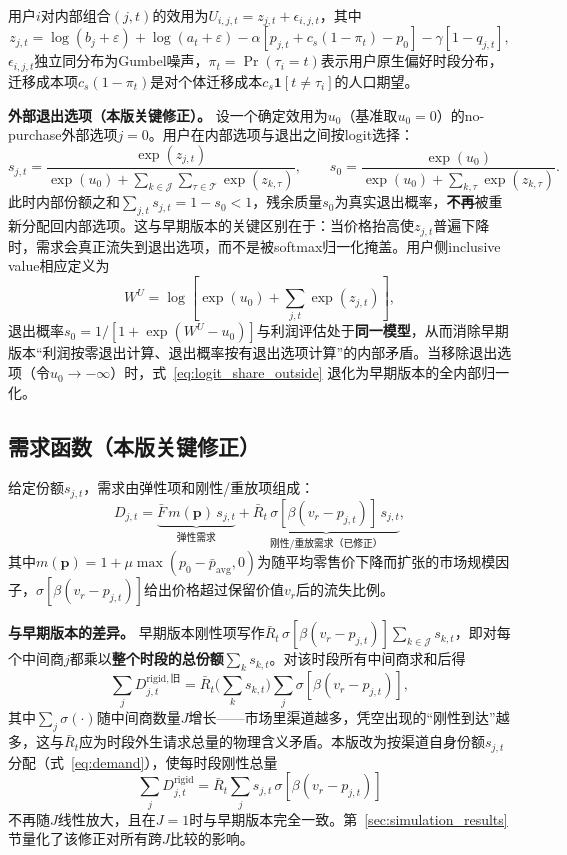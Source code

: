 \documentclass[UTF8,11pt]{ctexart}
\newcommand{\T}{\mathcal{T}}
\newcommand{\J}{\mathcal{J}}
\newcommand{\D}{D}
\newcommand{\p}{\boldsymbol{p}}
\begin{document}
用户$i$对内部组合$(j,t)$的效用为$U_{i,j,t}=z_{j,t}+\epsilon_{i,j,t}$，其中
\begin{equation}
  z_{j,t}=\log(b_j+\varepsilon)+\log(a_t+\varepsilon)
  -\alpha\left[p_{j,t}+c_s(1-\pi_t)-p_0\right]
  -\gamma[1-q_{j,t}],
  \label{eq:random_utility}
\end{equation}
$\epsilon_{i,j,t}$独立同分布为Gumbel噪声，$\pi_t=\Pr(\tau_i=t)$表示用户原生偏好时段分布，迁移成本项$c_s(1-\pi_t)$是对个体迁移成本$c_s\mathbf{1}[t\ne\tau_i]$的人口期望。

\textbf{外部退出选项（本版关键修正）。} 设一个确定效用为$u_0$（基准取$u_0=0$）的no-purchase外部选项$j=0$。用户在内部选项与退出之间按logit选择：
\begin{equation}
  s_{j,t}=\frac{\exp(z_{j,t})}
  {\exp(u_0)+\sum_{k\in\J}\sum_{\tau\in\T}\exp(z_{k,\tau})},
  \qquad
  s_0=\frac{\exp(u_0)}
  {\exp(u_0)+\sum_{k,\tau}\exp(z_{k,\tau})}.
  \label{eq:logit_share_outside}
\end{equation}
此时内部份额之和$\sum_{j,t}s_{j,t}=1-s_0<1$，残余质量$s_0$为真实退出概率，\textbf{不再}被重新分配回内部选项。这与早期版本的关键区别在于：当价格抬高使$z_{j,t}$普遍下降时，需求会真正流失到退出选项，而不是被softmax归一化掩盖。用户侧inclusive value相应定义为
\begin{equation}
  W^U=\log\!\left[\exp(u_0)+\sum_{j,t}\exp(z_{j,t})\right],
  \label{eq:inclusive_value}
\end{equation}
退出概率$s_0=1/[1+\exp(W^U-u_0)]$与利润评估处于\textbf{同一模型}，从而消除早期版本“利润按零退出计算、退出概率按有退出选项计算”的内部矛盾。当移除退出选项（令$u_0\to-\infty$）时，式~\eqref{eq:logit_share_outside} 退化为早期版本的全内部归一化。

\subsection{需求函数（本版关键修正）}
\label{sec:demand}

给定份额$s_{j,t}$，需求由弹性项和刚性/重放项组成：
\begin{equation}
  \D_{j,t}
  =\underbrace{\bar F\,m(\p)\,s_{j,t}}_{\text{弹性需求}}
  +\underbrace{\bar R_t\,\sigma[\beta(v_r-p_{j,t})]\,s_{j,t}}_{\text{刚性/重放需求（已修正）}},
  \label{eq:demand}
\end{equation}
其中$m(\p)=1+\mu\max(p_0-\bar p_{\mathrm{avg}},0)$为随平均零售价下降而扩张的市场规模因子，$\sigma[\beta(v_r-p_{j,t})]$给出价格超过保留价值$v_r$后的流失比例。

\textbf{与早期版本的差异。} 早期版本刚性项写作$\bar R_t\,\sigma[\beta(v_r-p_{j,t})]\sum_{k\in\J}s_{k,t}$，即对每个中间商$j$都乘以\textbf{整个时段的总份额}$\sum_k s_{k,t}$。对该时段所有中间商求和后得
\[
\sum_{j}\D^{\mathrm{rigid},\text{旧}}_{j,t}
=\bar R_t\Big(\textstyle\sum_k s_{k,t}\Big)\sum_j\sigma[\beta(v_r-p_{j,t})],
\]
其中$\sum_j\sigma(\cdot)$随中间商数量$J$增长——市场里渠道越多，凭空出现的“刚性到达”越多，这与$\bar R_t$应为时段外生请求总量的物理含义矛盾。本版改为按渠道自身份额$s_{j,t}$分配（式~\eqref{eq:demand}），使每时段刚性总量
\[
\sum_{j}\D^{\mathrm{rigid}}_{j,t}=\bar R_t\sum_j s_{j,t}\,\sigma[\beta(v_r-p_{j,t})]
\]
不再随$J$线性放大，且在$J=1$时与早期版本完全一致。第~\ref{sec:simulation_results} 节量化了该修正对所有跨$J$比较的影响。
\end{document}

